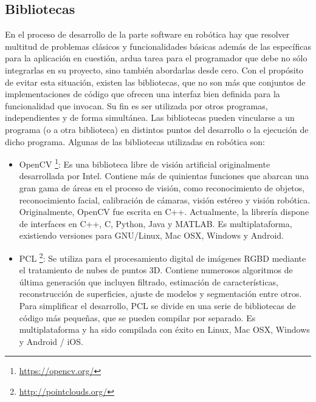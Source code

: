 \subsection{Bibliotecas}
En el proceso de desarrollo de la parte software en robótica hay que resolver multitud de problemas clásicos y funcionalidades básicas además de las específicas para la aplicación en cuestión, ardua tarea para el programador que debe no sólo integrarlas en su proyecto, sino también abordarlas desde cero. Con el propósito de evitar esta situación, existen las bibliotecas, que no son más que conjuntos de implementaciones de código que ofrecen una interfaz bien definida para la funcionalidad que invocan. Su fin es ser utilizada por otros programas, independientes y de forma simultánea. Las bibliotecas pueden vincularse a un programa (o a otra biblioteca) en distintos puntos del desarrollo o la ejecución de dicho programa. Algunas de las bibliotecas utilizadas en robótica son: 
\begin{itemize}
	\item OpenCV \footnote{\url{https://opencv.org/}}: Es una biblioteca libre de visión artificial originalmente desarrollada por Intel. Contiene más de quinientas funciones que abarcan una gran gama de áreas en el proceso de visión, como reconocimiento de objetos, reconocimiento facial, calibración de cámaras, visión estéreo y visión robótica. Originalmente, OpenCV fue escrita en C++. Actualmente, la librería dispone de interfaces en C++, C, Python, Java y MATLAB. Es multiplataforma, existiendo versiones para GNU/Linux, Mac OSX, Windows y Android. 
 \item PCL \footnote{\url{http://pointclouds.org/}}: Se utiliza para el procesamiento digital de imágenes RGBD mediante el tratamiento de nubes de puntos 3D. Contiene numerosos algoritmos de última generación que incluyen filtrado, estimación de características, reconstrucción de superficies, ajuste de modelos y segmentación entre otros. Para simplificar el desarrollo, PCL se divide en una serie de bibliotecas de código más pequeñas, que se pueden compilar por separado. Es multiplataforma y ha sido compilada con éxito en Linux, Mac OSX, Windows y Android / iOS.
\end{itemize}

